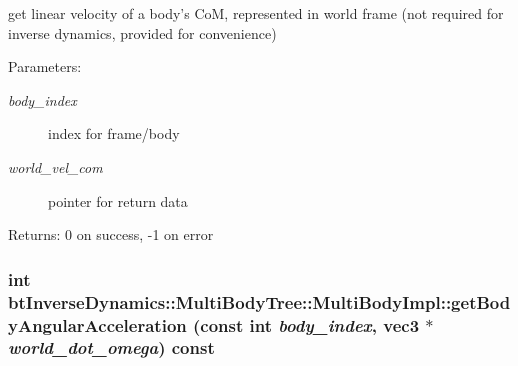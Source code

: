 get linear velocity of a body's CoM, represented in world frame (not required for inverse dynamics, provided for convenience) \begin{Desc}
\item[Parameters:]
\begin{description}
\item[{\em body\_\-index}]index for frame/body \item[{\em world\_\-vel\_\-com}]pointer for return data \end{description}
\end{Desc}
\begin{Desc}
\item[Returns:]0 on success, -1 on error \end{Desc}
 \hypertarget{classbt_inverse_dynamics_1_1_multi_body_tree_1_1_multi_body_impl_b63dfaa8b761e8258317835648c78358}{
\subsubsection[getBodyAngularAcceleration]{\setlength{\rightskip}{0pt plus 5cm}int btInverseDynamics::MultiBodyTree::MultiBodyImpl::getBodyAngularAcceleration (const int {\em body\_\-index}, \/  {\bf vec3} $\ast$ {\em world\_\-dot\_\-omega}) const}}
\label{classbt_inverse_dynamics_1_1_multi_body_tree_1_1_multi_body_impl_b63dfaa8b761e8258317835648c78358}


